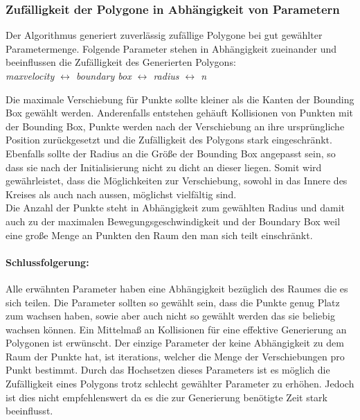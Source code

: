   \subsubsection{Zufälligkeit der Polygone in Abhängigkeit von Parametern}
    Der Algorithmus generiert zuverlässig zufällige Polygone bei gut
    gewählter Parametermenge.
    Folgende Parameter stehen in Abhängigkeit zueinander und beeinflussen die 
    Zufälligkeit des Generierten Polygons:\\
    \textit{maxvelocity $\leftrightarrow$ boundary box $\leftrightarrow$ radius $\leftrightarrow$ n}

    Die maximale Verschiebung für Punkte sollte kleiner als die Kanten der 
    Bounding Box gewählt werden. Anderenfalls entstehen gehäuft Kollisionen 
    von Punkten mit der Bounding Box, Punkte werden nach der Verschiebung an 
    ihre ursprüngliche Position zurückgesetzt und die Zufälligkeit des Polygons 
    stark eingeschränkt.
    Ebenfalls sollte der Radius an die Größe der Bounding Box angepasst sein, so dass sie nach der Initialisierung nicht zu dicht an dieser liegen. Somit wird gewährleistet, dass die Möglichkeiten zur Verschiebung, sowohl in das Innere des Kreises als auch nach aussen, möglichst vielfältig sind.\\
    Die Anzahl der Punkte steht in Abhängigkeit zum gewählten Radius und damit 
    auch zu der maximalen Bewegungsgeschwindigkeit und der Boundary Box 
    weil eine große Menge an Punkten den Raum den man sich teilt 
    einschränkt.
    \paragraph{Schlussfolgerung:}
    Alle erwähnten Parameter haben eine Abhängigkeit bezüglich des Raumes 
    die es sich teilen. Die Parameter sollten so gewählt sein, dass die 
    Punkte genug Platz zum wachsen haben, sowie aber auch nicht so gewählt 
    werden das sie beliebig wachsen können. Ein Mittelmaß an Kollisionen 
    für eine effektive Generierung an Polygonen ist erwünscht.
    Der einzige Parameter der keine Abhängigkeit zu dem Raum der Punkte hat, 
    ist iterations, welcher die Menge der Verschiebungen pro Punkt bestimmt.
    Durch das Hochsetzen dieses Parameters ist 
    es möglich die Zufälligkeit eines Polygons trotz schlecht gewählter 
    Parameter zu erhöhen. 
    Jedoch ist dies nicht empfehlenswert da es die 
    zur Generierung benötigte Zeit stark beeinflusst.  

  
